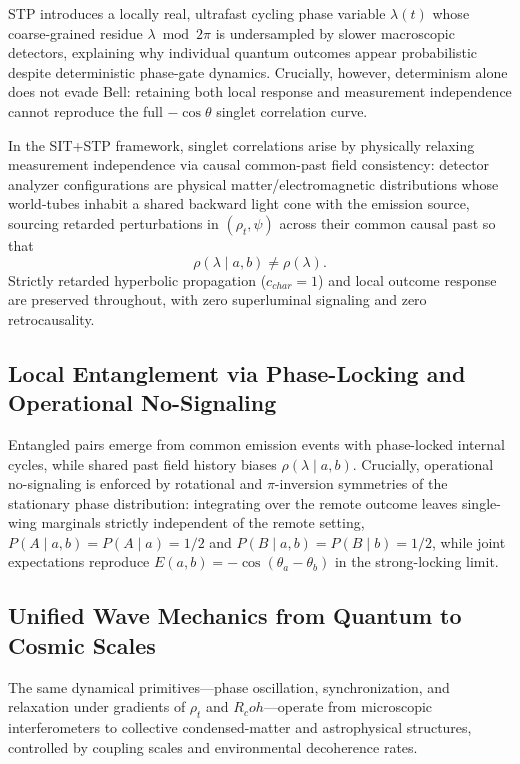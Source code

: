 \documentclass[american,11pt,letterpaper]{article}
\newcommand{\Rcoh}{R_{\mathrm{coh}}}
\def\mathrm#1{#1}%
\def\emph#1{#1}%
\def\Rcoh{R_coh}%
\begin{document}
STP introduces a locally real, ultrafast cycling phase variable $\lambda(t)$ whose coarse-grained residue $\lambda \bmod 2\pi$ is undersampled by slower macroscopic detectors, explaining why individual quantum outcomes appear probabilistic despite deterministic phase-gate dynamics. Crucially, however, \emph{determinism alone does not evade Bell}: retaining both local response and measurement independence cannot reproduce the full $-\cos\theta$ singlet correlation curve.

In the SIT+STP framework, singlet correlations arise by physically relaxing \emph{measurement independence} via causal common-past field consistency: detector analyzer configurations are physical matter/electromagnetic distributions whose world-tubes inhabit a shared backward light cone with the emission source, sourcing retarded perturbations in $(\rho_t, \psi)$ across their common causal past so that
\begin{equation}
\rho(\lambda \mid a, b) \ne \rho(\lambda).
\label{eq:bell_common_past_relaxation}
\end{equation}
Strictly retarded hyperbolic propagation ($c_{\mathrm{char}} = 1$) and local outcome response are preserved throughout, with zero superluminal signaling and zero retrocausality.

\subsection{Local Entanglement via Phase-Locking and Operational No-Signaling}

Entangled pairs emerge from common emission events with phase-locked internal cycles, while shared past field history biases $\rho(\lambda \mid a, b)$. Crucially, \emph{operational no-signaling} is enforced by rotational and $\pi$-inversion symmetries of the stationary phase distribution: integrating over the remote outcome leaves single-wing marginals strictly independent of the remote setting, $P(A \mid a, b) = P(A \mid a) = 1/2$ and $P(B \mid a, b) = P(B \mid b) = 1/2$, while joint expectations reproduce $E(a,b) = -\cos(\theta_a - \theta_b)$ in the strong-locking limit.

\subsection{Unified Wave Mechanics from Quantum to Cosmic Scales}

The same dynamical primitives---phase oscillation, synchronization, and relaxation under gradients of $\rho_t$ and $\Rcoh$---operate from microscopic interferometers to collective condensed-matter and astrophysical structures, controlled by coupling scales and environmental decoherence rates.
\end{document}

